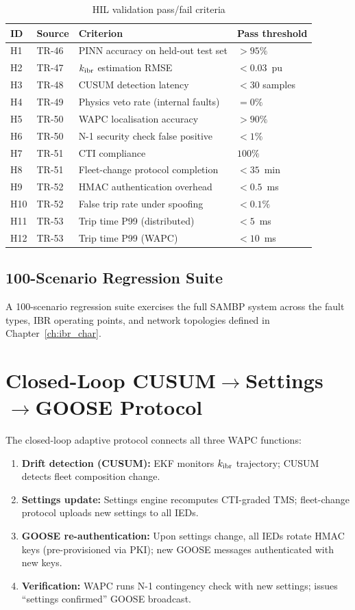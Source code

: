 \begin{table}[htbp]
\caption{HIL validation pass/fail criteria}
\label{tab:ch9_hil_criteria}
\small
\begin{tabularx}{\textwidth}{@{}llXl@{}}
\toprule
ID & Source & Criterion & Pass threshold \\
\midrule
H1 & TR-46 & PINN accuracy on held-out test set & $> 95\%$ \\
H2 & TR-47 & $k_\mathrm{ibr}$ estimation RMSE & $< 0.03$~pu \\
H3 & TR-48 & CUSUM detection latency & $< 30$ samples \\
H4 & TR-49 & Physics veto rate (internal faults) & $= 0\%$ \\
H5 & TR-50 & WAPC localisation accuracy & $> 90\%$ \\
H6 & TR-50 & N-1 security check false positive & $< 1\%$ \\
H7 & TR-51 & CTI compliance & $100\%$ \\
H8 & TR-51 & Fleet-change protocol completion & $< 35$~min \\
H9 & TR-52 & HMAC authentication overhead & $< 0.5$~ms \\
H10 & TR-52 & False trip rate under spoofing & $< 0.1\%$ \\
H11 & TR-53 & Trip time P99 (distributed) & $< 5$~ms \\
H12 & TR-53 & Trip time P99 (WAPC) & $< 10$~ms \\
\bottomrule
\end{tabularx}
\end{table}

\subsection{100-Scenario Regression Suite}

A 100-scenario regression suite exercises the full SAMBP system across
the fault types, IBR operating points, and network topologies defined
in Chapter~\ref{ch:ibr_char}.


\section{Closed-Loop CUSUM$\to$Settings$\to$GOOSE Protocol}
\label{sec:ch11_closedloop}

The closed-loop adaptive protocol connects all three WAPC functions:

\begin{enumerate}
\item \textbf{Drift detection (CUSUM):} EKF monitors $k_\mathrm{ibr}$ trajectory;
      CUSUM detects fleet composition change.
\item \textbf{Settings update:} Settings engine recomputes CTI-graded TMS;
      fleet-change protocol uploads new settings to all IEDs.
\item \textbf{GOOSE re-authentication:} Upon settings change, all IEDs
      rotate HMAC keys (pre-provisioned via PKI); new GOOSE messages
      authenticated with new keys.
\item \textbf{Verification:} WAPC runs N-1 contingency check with new settings;
      issues ``settings confirmed'' GOOSE broadcast.
\end{enumerate}

